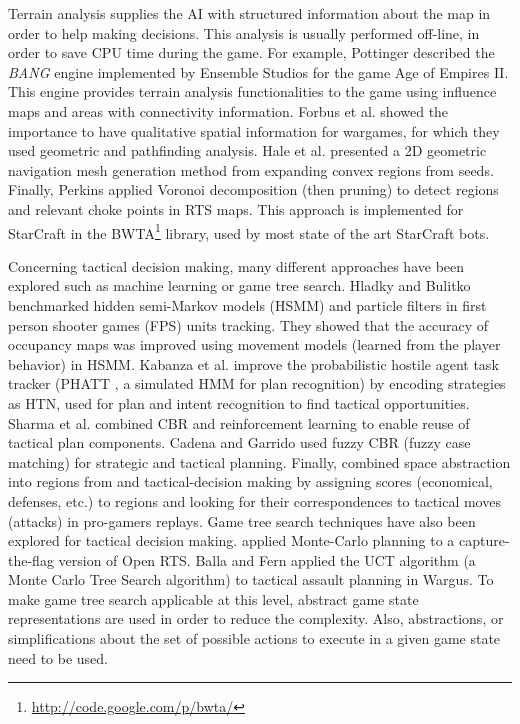 \documentclass[journal]{IEEEtran}
\begin{document}
Terrain analysis supplies the AI with structured information about the map in order to help making decisions. This analysis is usually performed off-line, in order to save CPU time during the game. For example, Pottinger \cite{Pottinger00} described the \emph{BANG} engine implemented by Ensemble Studios for the game Age of Empires II. This engine provides terrain analysis functionalities to the game using influence maps and areas with connectivity information. 
Forbus et al. \cite{Forbus2002} showed the importance to have qualitative spatial information for wargames, for which they used geometric and pathfinding analysis. 
Hale et al. \cite{Hale08} presented a 2D geometric navigation mesh generation method from expanding convex regions from seeds. 
Finally, Perkins \cite{Perkins10} applied Voronoi decomposition (then pruning) %
to detect regions and relevant choke points in RTS maps. This approach is implemented for StarCraft in the BWTA\footnote{\url{http://code.google.com/p/bwta/}} library, used by most state of the art StarCraft bots.

Concerning tactical decision making, many different approaches have been explored such as machine learning or game tree search. 
Hladky and Bulitko \cite{Hladky2008} benchmarked hidden semi-Markov models (HSMM) and particle filters in first person shooter games (FPS) units tracking. They showed that the accuracy of occupancy maps was improved using movement models (learned from the player behavior) in HSMM. Kabanza et al. \cite{OBRecog} improve the probabilistic hostile agent task tracker (PHATT \cite{PHATT}, a simulated HMM for plan recognition) by encoding strategies as HTN, used for plan and intent recognition to find tactical opportunities. Sharma et al. \cite{CBR-RL} combined CBR and reinforcement learning to enable reuse of tactical plan components. Cadena and Garrido \cite{CadenaG11} used fuzzy CBR (fuzzy case matching) for strategic and tactical planning. Finally, \cite{SynnaeveTactics} combined space abstraction into regions from \cite{Perkins10} and tactical-decision making by assigning scores (economical, defenses, etc.) to regions and looking for their correspondences to tactical moves (attacks) in pro-gamers replays.
Game tree search techniques have also been explored for tactical decision making. \cite{Chung05} applied Monte-Carlo planning to a capture-the-flag version of Open RTS. Balla and Fern \cite{UCT} applied the UCT algorithm (a Monte Carlo Tree Search algorithm) to tactical assault planning in Wargus. To make game tree search applicable at this level, abstract game state representations are used in order to reduce the complexity. Also, abstractions, or simplifications about the set of possible actions to execute in a given game state need to be used.
\end{document}
